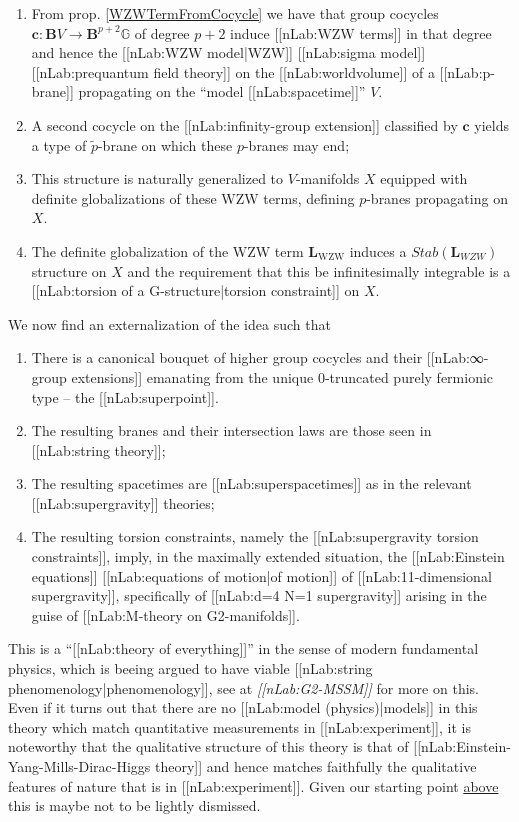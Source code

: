 \documentclass[12pt,titlepage]{article}
\theoremstyle{plain}
\theoremstyle{definition}
\theoremstyle{remark}
\begin{document}
\begin{enumerate}%
\item From prop. \ref{WZWTermFromCocycle} we have that group cocycles $\mathbf{c}\colon \mathbf{B}V \longrightarrow \mathbf{B}^{p+2}\mathbb{G}$ of degree $p+2$ induce [[nLab:WZW terms]] in that degree and hence the [[nLab:WZW model|WZW]] [[nLab:sigma model]] [[nLab:prequantum field theory]] on the [[nLab:worldvolume]] of a [[nLab:p-brane]] propagating on the ``model [[nLab:spacetime]]'' $V$.
\item A second cocycle on the [[nLab:infinity-group extension]] classified by $\mathbf{c}$ yields a type of $\tilde p$-brane on which these $p$-branes may end;
\item This structure is naturally generalized to $V$-manifolds $X$ equipped with definite globalizations of these WZW terms, defining $p$-branes propagating on $X$.
\item The definite globalization of the WZW term $\mathbf{L}_{\mathrm{WZW}}$ induces a $Stab(\mathbf{L}_{WZW})$ structure on $X$ and the requirement that this be infinitesimally integrable is a [[nLab:torsion of a G-structure|torsion constraint]] on $X$.
\end{enumerate}
We now find an externalization of the idea such that
\begin{enumerate}%
\item There is a canonical bouquet of higher group cocycles and their [[nLab:∞-group extensions]] emanating from the unique 0-truncated purely fermionic type -- the [[nLab:superpoint]].
\item The resulting branes and their intersection laws are those seen in [[nLab:string theory]];
\item The resulting spacetimes are [[nLab:superspacetimes]] as in the relevant [[nLab:supergravity]] theories;
\item The resulting torsion constraints, namely the [[nLab:supergravity torsion constraints]], imply, in the maximally extended situation, the [[nLab:Einstein equations]] [[nLab:equations of motion|of motion]] of [[nLab:11-dimensional supergravity]], specifically of [[nLab:d=4 N=1 supergravity]] arising in the guise of [[nLab:M-theory on G2-manifolds]].
\end{enumerate}
This is a ``[[nLab:theory of everything]]'' in the sense of modern fundamental physics, which is beeing argued to have viable [[nLab:string phenomenology|phenomenology]], see at \emph{[[nLab:G2-MSSM]]} for more on this. Even if it turns out that there are no [[nLab:model (physics)|models]] in this theory which match quantitative measurements in [[nLab:experiment]], it is noteworthy that the qualitative structure of this theory is that of [[nLab:Einstein-Yang-Mills-Dirac-Higgs theory]] and hence matches faithfully the qualitative features of nature that is in [[nLab:experiment]]. Given our starting point \hyperlink{TheGround}{above} this is maybe not to be lightly dismissed.
\end{document}
